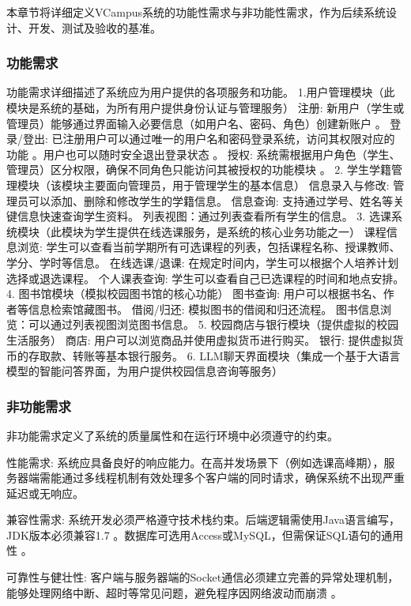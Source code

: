 本章节将详细定义VCampus系统的功能性需求与非功能性需求，作为后续系统设计、开发、测试及验收的基准。

\subsubsection{功能需求}

功能需求详细描述了系统应为用户提供的各项服务和功能。
1.用户管理模块（此模块是系统的基础，为所有用户提供身份认证与管理服务）
注册: 新用户（学生或管理员）能够通过界面输入必要信息（如用户名、密码、角色）创建新账户 。
登录/登出: 已注册用户可以通过唯一的用户名和密码登录系统，访问其权限对应的功能 。用户也可以随时安全退出登录状态 。
授权: 系统需根据用户角色（学生、管理员）区分权限，确保不同角色只能访问其被授权的功能模块 。
2. 学生学籍管理模块（该模块主要面向管理员，用于管理学生的基本信息）
信息录入与修改: 管理员可以添加、删除和修改学生的学籍信息。
信息查询: 支持通过学号、姓名等关键信息快速查询学生资料。
列表视图：通过列表查看所有学生的信息。
3. 选课系统模块（此模块为学生提供在线选课服务，是系统的核心业务功能之一）
课程信息浏览: 学生可以查看当前学期所有可选课程的列表，包括课程名称、授课教师、学分、学时等信息。
在线选课/退课: 在规定时间内，学生可以根据个人培养计划选择或退选课程。
个人课表查询: 学生可以查看自己已选课程的时间和地点安排。
4. 图书馆模块（模拟校园图书馆的核心功能）
图书查询: 用户可以根据书名、作者等信息检索馆藏图书。
借阅/归还: 模拟图书的借阅和归还流程。
图书信息浏览：可以通过列表视图浏览图书信息。
5. 校园商店与银行模块（提供虚拟的校园生活服务）
商店: 用户可以浏览商品并使用虚拟货币进行购买。
银行: 提供虚拟货币的存取款、转账等基本银行服务。
6. LLM聊天界面模块（集成一个基于大语言模型的智能问答界面，为用户提供校园信息咨询等服务）

\subsubsection{非功能需求}

非功能需求定义了系统的质量属性和在运行环境中必须遵守的约束。

性能需求: 系统应具备良好的响应能力。在高并发场景下（例如选课高峰期），服务器端需能通过多线程机制有效处理多个客户端的同时请求，确保系统不出现严重延迟或无响应。

兼容性需求: 系统开发必须严格遵守技术栈约束。后端逻辑需使用Java语言编写，JDK版本必须兼容1.7 。数据库可选用Access或MySQL，但需保证SQL语句的通用性 。

可靠性与健壮性: 客户端与服务器端的Socket通信必须建立完善的异常处理机制，能够处理网络中断、超时等常见问题，避免程序因网络波动而崩溃 。

